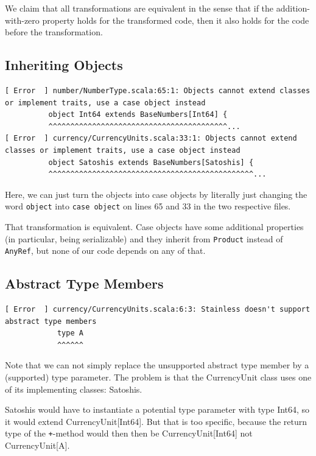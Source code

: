 \documentclass[runningheads]{llncs}
\begin{document}
We claim that all transformations are equivalent in the sense that if
the addition-with-zero property holds for the transformed code, then
it also holds for the code before the transformation.


\subsection{Inheriting Objects}


\begin{lstlisting}[style=stainless]
[ Error  ] number/NumberType.scala:65:1: Objects cannot extend classes or implement traits, use a case object instead
          object Int64 extends BaseNumbers[Int64] {
          ^^^^^^^^^^^^^^^^^^^^^^^^^^^^^^^^^^^^^^^^^...
[ Error  ] currency/CurrencyUnits.scala:33:1: Objects cannot extend classes or implement traits, use a case object instead
          object Satoshis extends BaseNumbers[Satoshis] {
          ^^^^^^^^^^^^^^^^^^^^^^^^^^^^^^^^^^^^^^^^^^^^^^^...
\end{lstlisting}

Here, we can just turn the objects into case objects by literally just
changing the word \texttt{object} into \texttt{case object} on lines
65 and 33 in the two respective files.

That transformation is equivalent. Case objects have some additional
properties (in particular, being serializable) and they inherit from
\texttt{Product} instead of \texttt{AnyRef}, but none of our code
depends on any of that.


\subsection{Abstract Type Members}


\begin{lstlisting}[style=stainless]
[ Error  ] currency/CurrencyUnits.scala:6:3: Stainless doesn't support abstract type members
            type A
            ^^^^^^
\end{lstlisting}

Note that we can not simply replace the unsupported abstract type
member by a (supported) type parameter. The problem is that the
CurrencyUnit class uses one of its implementing classes: Satoshis.

Satoshis would have to instantiate a potential type parameter with
type Int64, so it would extend CurrencyUnit[Int64]. But that is too
specific, because the return type of the \texttt{+}-method would then then be
CurrencyUnit[Int64] not CurrencyUnit[A].
\end{document}

